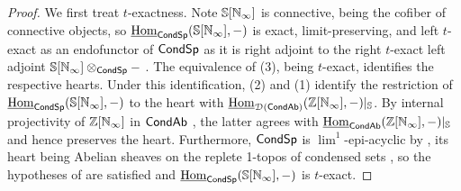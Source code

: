 \begin{proof}
    We first treat $t$-exactness. Note $\mathbb{S}[\mathbb{N}_{\infty}]$ is connective, being the cofiber of connective objects, so $\underline{\mathrm{Hom}}_{\mathsf{Cond}\mathsf{Sp}}(\mathbb{S}[\mathbb{N}_{\infty}],-)$ is exact, limit-preserving, and left $t$-exact as an endofunctor of $\mathsf{Cond}\mathsf{Sp}$ as it is right adjoint to the right $t$-exact left adjoint $\mathbb{S}[\mathbb{N}_{\infty}]\otimes_{\mathsf{Cond}\mathsf{Sp}}-$ \cite[Prop. 1.3.17 (ii)]{Perverse}. The equivalence of  (3), being $t$-exact, identifies the respective hearts. Under this identification,  (2) and  (1) identify the restriction of $\underline{\mathrm{Hom}}_{\mathsf{Cond}\mathsf{Sp}}(\mathbb{S}[\mathbb{N}_{\infty}],-)$ to the heart with $\underline{\mathrm{Hom}}_{\EuScript{D}(\mathsf{Cond}\mathsf{Ab})}(\mathbb{Z}[\mathbb{N}_{\infty}],-)|_{\mathbb{S}}$. By internal projectivity of $\mathbb{Z}[\mathbb{N}_{\infty}]$ in $\mathsf{Cond}\mathsf{Ab}$ \cite[Thm. 2.3.3]{CamargoSolid}, the latter agrees with $\underline{\mathrm{Hom}}_{\mathsf{Cond}\mathsf{Ab}}(\mathbb{Z}[\mathbb{N}_{\infty}],-)|_{\mathbb{S}}$ \cite[Rmk. 3.2.2]{CamargoSolid} and hence preserves the heart. Furthermore, $\mathsf{Cond}\mathsf{Sp}$ is $\lim^{1}$-epi-acyclic by , its heart being Abelian sheaves on the replete 1-topos of condensed sets \cite[Prop. 2.1.4 \& Rmk. 2.2.2]{CamargoSolid}, so the hypotheses of  are satisfied and $\underline{\mathrm{Hom}}_{\mathsf{Cond}\mathsf{Sp}}(\mathbb{S}[\mathbb{N}_{\infty}],-)$ is $t$-exact.


\end{proof}
